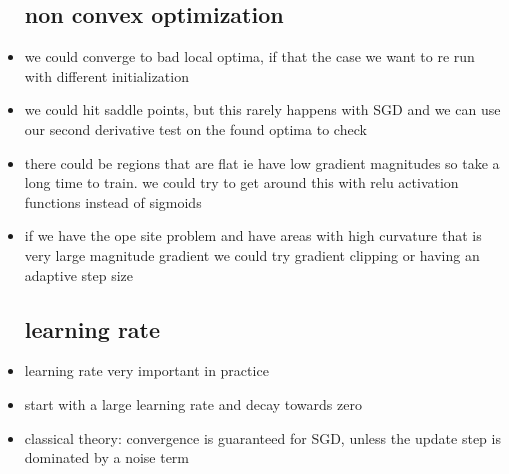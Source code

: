 \documentclass{article}
\begin{document}
\begin{itemize}
\subsection{ non convex optimization}
\item we could converge to bad local optima, if that the case we want to re run with different initialization 
\item we could hit saddle points, but this rarely happens with SGD and we can use our second derivative test on the found optima to check 
\item there could be regions that are flat ie have low gradient magnitudes so take a long time to train. we could try to get around this with relu activation functions instead of sigmoids
\item if we have the ope site problem and have areas with high curvature that is very large magnitude gradient we could try gradient clipping or having an adaptive step size
\subsection{learning rate}
\item learning rate very important in practice
\item start with a large learning rate and decay towards zero
\item classical theory: convergence is guaranteed for SGD, unless the update step is dominated by a noise term 

\end{itemize}
\end{document}
